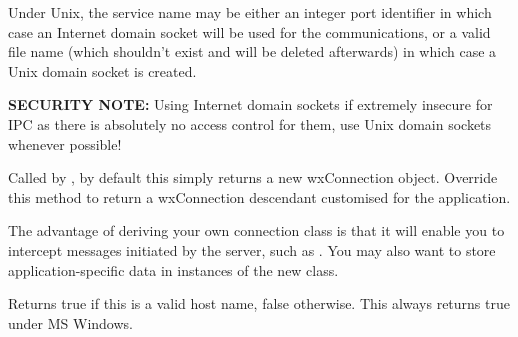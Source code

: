 Under Unix, the service name may be either an integer port
identifier in which case an Internet domain socket will be used
for the communications, or a valid file name (which shouldn't
exist and will be deleted afterwards) in which case a Unix domain
socket is created.

{\bf SECURITY NOTE:} Using Internet domain sockets if extremely
insecure for IPC as there is absolutely no access control for
them, use Unix domain sockets whenever possible!

\label{wxddeclientonmakeconnection}


Called by , by
default this simply returns a new wxConnection object. Override
this method to return a wxConnection descendant customised for the
application.

The advantage of deriving your own connection class is that it
will enable you to intercept messages initiated by the server,
such as . You
may also want to store application-specific data in instances of
the new class.



Returns true if this is a valid host name, false otherwise. This always
returns true under MS Windows.

